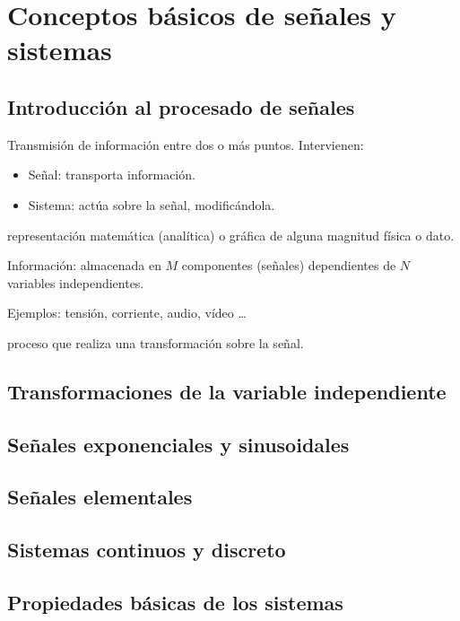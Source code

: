 \section{Conceptos básicos de señales y sistemas}
\subsection{Introducción al procesado de señales}
 Transmisión de información entre dos o más puntos. Intervienen:
\begin{itemize}[label=$-$]
\item Señal: transporta información.
\item Sistema: actúa sobre la señal, modificándola.
\end{itemize}
 representación matemática (analítica) o gráfica de alguna magnitud física o dato.

Información: almacenada en $M$ componentes (señales) dependientes de $N$ variables independientes.

Ejemplos: tensión, corriente, audio, vídeo \dots

 proceso que realiza una transformación sobre la señal.

\begin{center}
\end{center}
\subsection{Transformaciones de la variable independiente}
\subsection{Señales exponenciales y sinusoidales}
\subsection{Señales elementales}
\subsection{Sistemas continuos y discreto}
\subsection{Propiedades básicas de los sistemas}